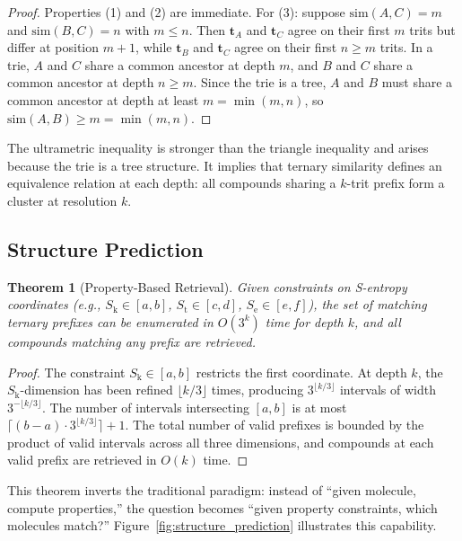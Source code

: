 \documentclass[11pt,a4paper]{article}
\newtheorem{theorem}{Theorem}[section]
\theoremstyle{definition}
\theoremstyle{remark}
\newcommand{\Sk}{S_{\mathrm{k}}}
\newcommand{\St}{S_{\mathrm{t}}}
\newcommand{\Se}{S_{\mathrm{e}}}
\begin{document}
\begin{proof}
Properties (1) and (2) are immediate. For (3): suppose $\mathrm{sim}(A,C) = m$ and $\mathrm{sim}(B,C) = n$ with $m \leq n$. Then $\mathbf{t}_A$ and $\mathbf{t}_C$ agree on their first $m$ trits but differ at position $m+1$, while $\mathbf{t}_B$ and $\mathbf{t}_C$ agree on their first $n \geq m$ trits. In a trie, $A$ and $C$ share a common ancestor at depth $m$, and $B$ and $C$ share a common ancestor at depth $n \geq m$. Since the trie is a tree, $A$ and $B$ must share a common ancestor at depth at least $m = \min(m, n)$, so $\mathrm{sim}(A, B) \geq m = \min(m, n)$.
\end{proof}

The ultrametric inequality is stronger than the triangle inequality and arises because the trie is a tree structure. It implies that ternary similarity defines an equivalence relation at each depth: all compounds sharing a $k$-trit prefix form a cluster at resolution $k$.

\subsection{Structure Prediction}

\begin{theorem}[Property-Based Retrieval]
\label{thm:property_retrieval}
Given constraints on S-entropy coordinates (e.g., $\Sk \in [a,b]$, $\St \in [c,d]$, $\Se \in [e,f]$), the set of matching ternary prefixes can be enumerated in $O(3^k)$ time for depth $k$, and all compounds matching any prefix are retrieved.
\end{theorem}

\begin{proof}
The constraint $\Sk \in [a,b]$ restricts the first coordinate. At depth $k$, the $\Sk$-dimension has been refined $\lfloor k/3 \rfloor$ times, producing $3^{\lfloor k/3 \rfloor}$ intervals of width $3^{-\lfloor k/3 \rfloor}$. The number of intervals intersecting $[a,b]$ is at most $\lceil (b-a) \cdot 3^{\lfloor k/3 \rfloor} \rceil + 1$. The total number of valid prefixes is bounded by the product of valid intervals across all three dimensions, and compounds at each valid prefix are retrieved in $O(k)$ time.
\end{proof}

This theorem inverts the traditional paradigm: instead of ``given molecule, compute properties,'' the question becomes ``given property constraints, which molecules match?'' Figure~\ref{fig:structure_prediction} illustrates this capability.
\end{document}
